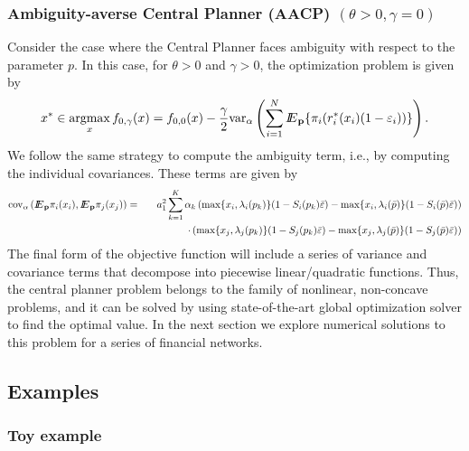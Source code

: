 \subsubsection{Ambiguity-averse Central Planner (AACP) $(\theta>0,\gamma=0)$}
Consider the case where the Central Planner faces ambiguity with respect to the parameter $p$.  In this case, for $\theta>0$ and $\gamma>0$, the optimization problem is given by
\begin{equation}\label{eq:aacp}
x^*\in\mathop{\rm argmax}_{x}  f_{0,\gamma}(x)= f_{0,0}(x) - \frac{\gamma}{2}{\mathop{\rm var}\nolimits}_{\alpha} \left(\sum_{i=1}^N {I\kern-.35em E}_{\bf p}\{\pi_i(r^*_i(x_i)(1-\varepsilon_i))\}\right).
\end{equation}
We follow the same strategy to compute the ambiguity term, i.e., by computing the individual covariances.  These terms are given by 
\begin{eqnarray*}
{\mathop{\rm cov}\nolimits}_\alpha\left({I\kern-.35em E}_{\bf p}\pi_i(x_i),{I\kern-.35em E}_{\bf p}\pi_j(x_j)\right)&=&a_1^2\sum_{k=1}^K \alpha_k \left(\max\{x_i,\lambda_i(p_k)\}(1-S_i(p_k)\bar{\varepsilon}) - \max\{x_i,\lambda_i(\bar{p})\}(1-S_i(\bar{p})\bar{\varepsilon}) \right)\\
&&\quad\quad\quad\quad\cdot\left(\max\{x_j,\lambda_j(p_k)\}(1-S_j(p_k)\bar{\varepsilon}) - \max\{x_j,\lambda_j(\bar{p})\}(1-S_j(\bar{p})\bar{\varepsilon}) \right)
\end{eqnarray*} 
The final form of the objective function will include a series of variance and covariance terms that decompose into piecewise linear/quadratic functions.  Thus, the central planner problem belongs to the family of nonlinear, non-concave problems, and it can be solved by using state-of-the-art global optimization solver to find the optimal value.  In the next section we explore numerical solutions to this problem for a series of financial networks.

\subsection{Examples}
\subsubsection{Toy example}
\subsubsection{}